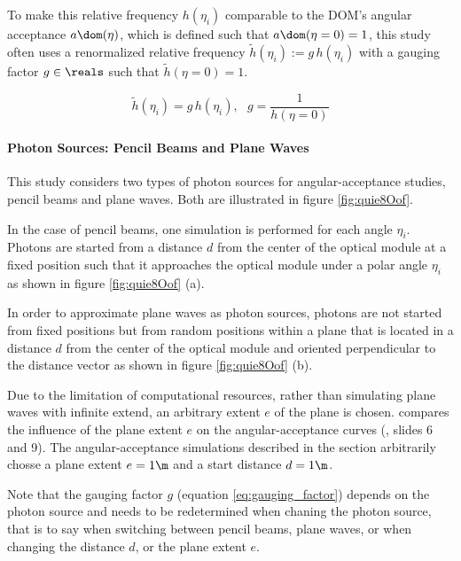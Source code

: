 To make this relative frequency $h(\eta_i)$ comparable to the DOM's angular acceptance $a\dom(\eta)$, which is defined such that $a\dom(\eta = 0) = 1$, this study often uses a renormalized relative frequency $\tilde{h}(\eta_i):=g\,h(\eta_i)$ with a gauging factor $g\in\reals$ such that $\tilde{h}(\eta = 0) = 1$.

\begin{equation}
  \tilde{h}(\eta_i) = g\,h(\eta_i), \ \ \
  g = \frac{1}{h(\eta = 0)}
  \label{eq:gauging_factor}
\end{equation}


\paragraph{Photon Sources: Pencil Beams and Plane Waves}
This study considers two types of photon sources for angular-acceptance studies, pencil beams and plane waves. Both are illustrated in figure \ref{fig:quie8Oof}.

In the case of pencil beams, one simulation is performed for each angle $\eta_i$. Photons are started from a distance $d$ from the center of the optical module at a fixed position such that it approaches the optical module under a polar angle $\eta_i$ as shown in figure \ref{fig:quie8Oof} (a).

In order to approximate plane waves as photon sources, photons are not started from fixed positions but from random positions within a plane that is located in a distance $d$ from the center of the optical module and oriented perpendicular to the distance vector as shown in figure \ref{fig:quie8Oof} (b).

Due to the limitation of computational resources, rather than simulating plane waves with infinite extend, an arbitrary extent $e$ of the plane is chosen.  \cite{martindardupdate} compares the influence of the plane extent $e$ on the angular-acceptance curves (\cite{martindardupdate}, slides 6 and 9). The angular-acceptance simulations described in the section arbitrarily chosse a plane extent $e = 1\m$ and a start distance $d = 1\m$.

Note that the gauging factor $g$ (equation \ref{eq:gauging_factor}) depends on the photon source and needs to be redetermined when chaning the photon source, that is to say when switching between pencil beams, plane waves, or when changing the distance $d$, or the plane extent $e$.


